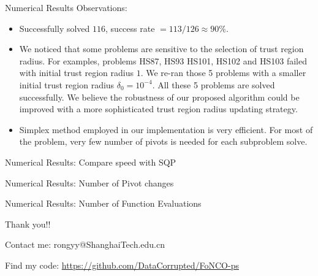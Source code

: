 \documentclass[8pt]{beamer}
\begin{document}
	\begin{frame}{Numerical Results}
		Observations: 
		\vfill
		\begin{itemize}
			\item  Successfully solved $116$, success rate   $  = 113/126 \approx 90 \%$. 
		\vfill
			\item  We noticed that some problems are sensitive to the selection of trust region radius. For examples, problems HS87, HS93 HS101, HS102 and HS103 failed with initial trust region radius $1$. We re-ran those 5 problems with a smaller initial trust region radius $\delta_{0} = 10^{-4}$. All these 5 problems are solved successfully. We believe the robustness of our proposed algorithm could be improved with a more sophisticated trust region radius updating strategy. 
		\vfill
			\item Simplex method employed in our implementation is very efficient. For most of the problem, very few number of pivots is needed for each subproblem solve. 
		\end{itemize}
	\end{frame}

	\begin{frame}[c]{Numerical Results: Compare speed with SQP  }
		
	\end{frame}

	\begin{frame}[c]{Numerical Results:  Number of Pivot changes }
		\begin{center}
		 
		\end{center}
	\end{frame}

	\begin{frame}[c]{Numerical Results:  Number of Function Evaluations}
		\begin{center}
		 
		\end{center}
	\end{frame}
		
	\begin{frame}[c]{ }
		\centerline{\red Thank you!!}
		\vspace{3em}
		\centerline{\red  Contact me: rongyy@ShanghaiTech.edu.cn}
		\vspace{3em}
		\centerline{\red Find my code: \underline  {  https://github.com/DataCorrupted/FoNCO-ps}}
	\end{frame}
\end{document}
